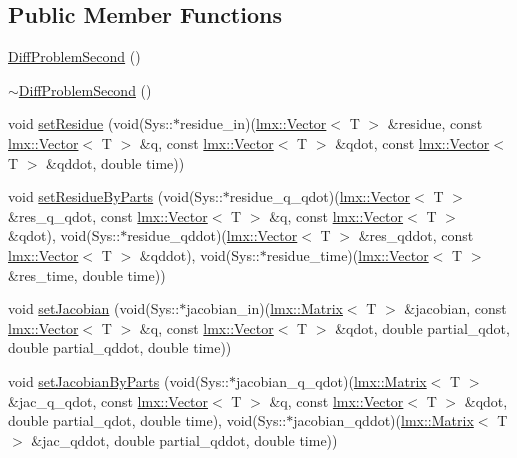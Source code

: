 \subsection*{Public Member Functions}
\begin{DoxyCompactItemize}
\item 
\hyperlink{classlmx_1_1DiffProblemSecond_a211dd07785bca2748566e9c540f94dda}{Diff\-Problem\-Second} ()
\item 
\hyperlink{classlmx_1_1DiffProblemSecond_acc07cd56a95b7ce60240ca8431162f3c}{$\sim$\-Diff\-Problem\-Second} ()
\item 
void \hyperlink{classlmx_1_1DiffProblemSecond_aad65044bcad25bc1094ca7a7e0557f64}{set\-Residue} (void(Sys\-::$\ast$residue\-\_\-in)(\hyperlink{classlmx_1_1Vector}{lmx\-::\-Vector}$<$ T $>$ \&residue, const \hyperlink{classlmx_1_1Vector}{lmx\-::\-Vector}$<$ T $>$ \&q, const \hyperlink{classlmx_1_1Vector}{lmx\-::\-Vector}$<$ T $>$ \&qdot, const \hyperlink{classlmx_1_1Vector}{lmx\-::\-Vector}$<$ T $>$ \&qddot, double time))
\item 
void \hyperlink{classlmx_1_1DiffProblemSecond_a84b8d2884acb8013b1a9b5a16098751a}{set\-Residue\-By\-Parts} (void(Sys\-::$\ast$residue\-\_\-q\-\_\-qdot)(\hyperlink{classlmx_1_1Vector}{lmx\-::\-Vector}$<$ T $>$ \&res\-\_\-q\-\_\-qdot, const \hyperlink{classlmx_1_1Vector}{lmx\-::\-Vector}$<$ T $>$ \&q, const \hyperlink{classlmx_1_1Vector}{lmx\-::\-Vector}$<$ T $>$ \&qdot), void(Sys\-::$\ast$residue\-\_\-qddot)(\hyperlink{classlmx_1_1Vector}{lmx\-::\-Vector}$<$ T $>$ \&res\-\_\-qddot, const \hyperlink{classlmx_1_1Vector}{lmx\-::\-Vector}$<$ T $>$ \&qddot), void(Sys\-::$\ast$residue\-\_\-time)(\hyperlink{classlmx_1_1Vector}{lmx\-::\-Vector}$<$ T $>$ \&res\-\_\-time, double time))
\item 
void \hyperlink{classlmx_1_1DiffProblemSecond_a5997efad5cf0b0a91899b7262cd6e31f}{set\-Jacobian} (void(Sys\-::$\ast$jacobian\-\_\-in)(\hyperlink{classlmx_1_1Matrix}{lmx\-::\-Matrix}$<$ T $>$ \&jacobian, const \hyperlink{classlmx_1_1Vector}{lmx\-::\-Vector}$<$ T $>$ \&q, const \hyperlink{classlmx_1_1Vector}{lmx\-::\-Vector}$<$ T $>$ \&qdot, double partial\-\_\-qdot, double partial\-\_\-qddot, double time))
\item 
void \hyperlink{classlmx_1_1DiffProblemSecond_abb7856200fac8d1a717ab2a6de0f4b1b}{set\-Jacobian\-By\-Parts} (void(Sys\-::$\ast$jacobian\-\_\-q\-\_\-qdot)(\hyperlink{classlmx_1_1Matrix}{lmx\-::\-Matrix}$<$ T $>$ \&jac\-\_\-q\-\_\-qdot, const \hyperlink{classlmx_1_1Vector}{lmx\-::\-Vector}$<$ T $>$ \&q, const \hyperlink{classlmx_1_1Vector}{lmx\-::\-Vector}$<$ T $>$ \&qdot, double partial\-\_\-qdot, double time), void(Sys\-::$\ast$jacobian\-\_\-qddot)(\hyperlink{classlmx_1_1Matrix}{lmx\-::\-Matrix}$<$ T $>$ \&jac\-\_\-qddot, double partial\-\_\-qddot, double time))

\end{DoxyCompactItemize}

